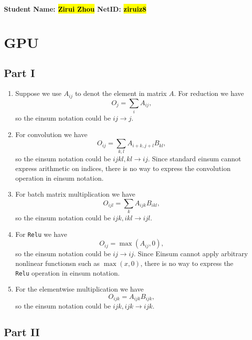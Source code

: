 \documentclass[10pt]{article}
\begin{document}
\vspace*{-0.2in}

\begin{center}
\bf Student Name: \hl{Zirui Zhou} \hspace{3mm} NetID: \hl{ziruiz8}
\end{center}

\normalsize

\section{GPU}

\subsection{Part I}

\begin{enumerate}
	\item Suppose we use $A_{ij}$ to denot the element in matrix $A$. For reduction we have $$O_j=\sum_i A_{ij},$$ so the einsum notation could be $ij\to j$.
	\item For convolution we have $$O_{ij}=\sum_{k,l} A_{i+k,j+l}B_{kl},$$ so the einsum notation could be $ijkl,kl\to ij.$ Since standard einsum cannot express arithmetic on indices, there is no way to express the convolution operation in einsum notation.
	\item For batch matrix multiplication we have $$O_{ijl}=\sum_k A_{ijk}B_{ikl},$$ so the einsum notation could be $ijk,ikl\to ijl.$
	\item For \texttt{Relu} we have $$O_{ij}=\max(A_{ij},0),$$ so the einsum notation could be $ij\to ij.$ Since Einsum cannot apply arbitrary nonlinear functionsn such as $\max(x, 0)$, there is no way to express the \texttt{Relu} operation in einsum notation.
	\item For the elementwise multiplication we have $$O_{ijk}=A_{ijk}B_{ijk},$$ so the einsum notation could be $ijk,ijk\to ijk.$
\end{enumerate}

\subsection{Part II}
\end{document}
